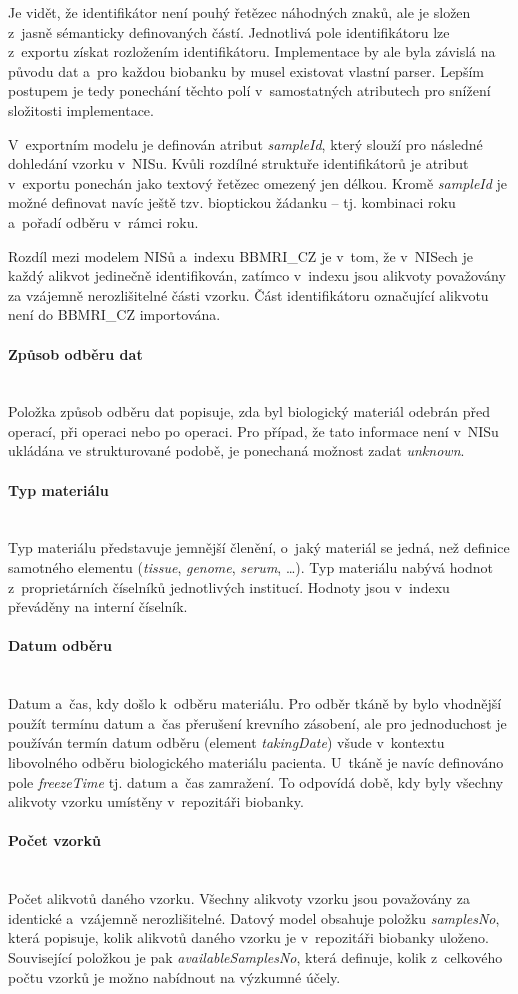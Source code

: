 \documentclass[11pt, final, oneside]{fithesis2}
\newcommand{\paragraphNewLine}[1]{\paragraph*{#1}\mbox{}\\}
\newcommand{\ProjectName}{\mbox{BBMRI\_CZ}\xspace}
\begin{document}
Je vidět, že identifikátor není pouhý řetězec náhodných znaků, ale je složen z~jasně sémanticky definovaných částí. Jednotlivá pole identifikátoru lze z~exportu získat rozložením identifikátoru. Implementace by ale byla závislá na původu dat a~pro každou biobanku by musel existovat vlastní parser. Lepším postupem je tedy ponechání těchto polí v~samostatných atributech pro snížení složitosti implementace. 

V~exportním modelu je definován atribut \textit{sampleId}, který slouží pro následné dohledání vzorku v~NISu. Kvůli rozdílné struktuře identifikátorů je atribut v~exportu ponechán jako textový řetězec omezený jen délkou. Kromě \textit{sampleId} je možné definovat navíc ještě tzv. bioptickou žádanku -- tj. kombinaci roku a~pořadí odběru v~rámci roku.

Rozdíl mezi modelem NISů a~indexu \ProjectName je v~tom, že v~NISech je každý alikvot jedinečně identifikován, zatímco v~indexu jsou alikvoty považovány za vzájemně nerozlišitelné části vzorku. Část identifikátoru označující alikvotu není do \ProjectName importována.	
					
 \paragraphNewLine{Způsob odběru dat}					
	Položka způsob odběru dat popisuje, zda byl biologický materiál odebrán před operací, při operaci nebo po operaci. Pro případ, že tato informace není v~NISu ukládána ve strukturované podobě, je ponechaná možnost zadat \textit{unknown}.

\paragraphNewLine{Typ materiálu}
Typ materiálu představuje jemnější členění, o~jaký materiál se jedná, než definice samotného elementu (\textit{tissue}, \textit{genome}, \textit{serum}, \ldots). Typ materiálu nabývá hodnot z~proprietárních číselníků jednotlivých institucí. Hodnoty jsou v~indexu převáděny na interní číselník.
		
\paragraphNewLine{Datum odběru}
Datum a~čas, kdy došlo k~odběru materiálu. Pro odběr tkáně by bylo vhodnější použít termínu datum a~čas přerušení krevního zásobení, ale pro jednoduchost je používán termín datum odběru (element \textit{takingDate}) všude v~kontextu libovolného odběru biologického materiálu pacienta.
U~tkáně je navíc definováno pole \textit{freezeTime} tj. datum a~čas zamražení. To odpovídá době, kdy byly všechny alikvoty vzorku umístěny v~repozitáři biobanky.

\paragraphNewLine{Počet vzorků}
Počet alikvotů daného vzorku. Všechny alikvoty vzorku jsou považovány za identické a~vzájemně nerozlišitelné. 
Datový model obsahuje položku \textit{samplesNo}, která popisuje, kolik alikvotů daného vzorku je v~repozitáři biobanky uloženo. Související položkou je pak \textit{availableSamplesNo}, která definuje, kolik z~celkového počtu vzorků je možno nabídnout na výzkumné účely.
\end{document}

